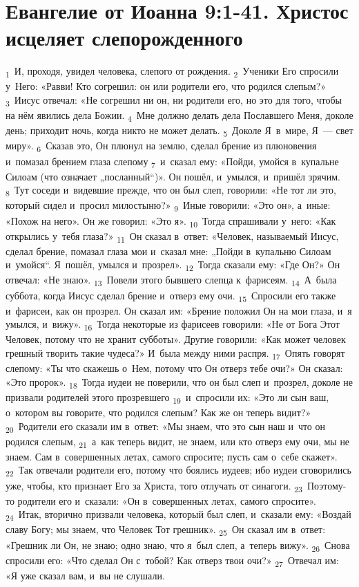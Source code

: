 \documentclass[a4paper,12pt]{article}
\begin{document}

\section{Евангелие от Иоанна 9:1-41. Христос исцеляет слепорожденного}

\textsubscript{1}~И, проходя, увидел человека, слепого от рождения. \textsubscript{2}~Ученики Его спросили у~Него: «Равви! Кто согрешил: он или родители его, что родился слепым?» \textsubscript{3}~Иисус отвечал: «Не согрешил ни он, ни родители его, но это для того, чтобы на нём явились дела Божии. \textsubscript{4}~Мне должно делать дела Пославшего Меня, доколе день; приходит ночь, когда никто не может делать. \textsubscript{5}~Доколе Я~в~мире, Я~— свет миру». \textsubscript{6}~Сказав это, Он плюнул на землю, сделал брение из плюновения и~помазал брением глаза слепому \textsubscript{7}~и~сказал ему: «Пойди, умойся в~купальне Силоам (что означает „посланный“)». Он пошёл, и~умылся, и~пришёл зрячим. \textsubscript{8}~Тут соседи и~видевшие прежде, что он был слеп, говорили: «Не тот ли это, который сидел и~просил милостыню?» \textsubscript{9}~Иные говорили: «Это он», а~иные: «Похож на него». Он же говорил: «Это я». \textsubscript{10}~Тогда спрашивали у~него: «Как открылись у~тебя глаза?» \textsubscript{11}~Он сказал в~ответ: «Человек, называемый Иисус, сделал брение, помазал глаза мои и~сказал мне: „Пойди в~купальню Силоам и~умойся“. Я~пошёл, умылся и~прозрел». \textsubscript{12}~Тогда сказали ему: «Где Он?» Он отвечал: «Не знаю». \textsubscript{13}~Повели этого бывшего слепца к~фарисеям. \textsubscript{14}~А~была суббота, когда Иисус сделал брение и~отверз ему очи. \textsubscript{15}~Спросили его также и~фарисеи, как он прозрел. Он сказал им: «Брение положил Он на мои глаза, и~я умылся, и~вижу». \textsubscript{16}~Тогда некоторые из фарисеев говорили: «Не от Бога Этот Человек, потому что не хранит субботы». Другие говорили: «Как может человек грешный творить такие чудеса?» И~была между ними распря. \textsubscript{17}~Опять говорят слепому: «Ты что скажешь о~Нем, потому что Он отверз тебе очи?» Он сказал: «Это пророк». \textsubscript{18}~Тогда иудеи не поверили, что он был слеп и~прозрел, доколе не призвали родителей этого прозревшего \textsubscript{19}~и~спросили их: «Это ли сын ваш, о~котором вы говорите, что родился слепым? Как же он теперь видит?» \textsubscript{20}~Родители его сказали им в~ответ: «Мы знаем, что это сын наш и~что он родился слепым, \textsubscript{21}~а~как теперь видит, не знаем, или кто отверз ему очи, мы не знаем. Сам в~совершенных летах, самого спросите; пусть сам о~себе скажет». \textsubscript{22}~Так отвечали родители его, потому что боялись иудеев; ибо иудеи сговорились уже, чтобы, кто признает Его за Христа, того отлучать от синагоги. \textsubscript{23}~Поэтому-то родители его и~сказали: «Он в~совершенных летах, самого спросите». \textsubscript{24}~Итак, вторично призвали человека, который был слеп, и~сказали ему: «Воздай славу Богу; мы знаем, что Человек Тот грешник». \textsubscript{25}~Он сказал им в~ответ: «Грешник ли Он, не знаю; одно знаю, что я~был слеп, а~теперь вижу». \textsubscript{26}~Снова спросили его: «Что сделал Он с~тобой? Как отверз твои очи?» \textsubscript{27}~Отвечал им: «Я уже сказал вам, и~вы не слушали. 
\end{document}
